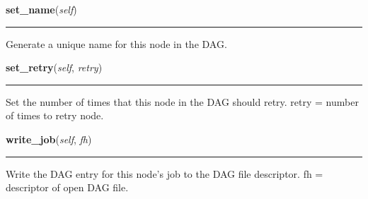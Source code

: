     \label{pipeline:CondorDAGNode:set_name}
    \vspace{0.5ex}

    \noindent\begin{boxedminipage}{\textwidth}

    \raggedright \textbf{set\_name}(\textit{self})

    \vspace{-1.5ex}

    \rule{\textwidth}{0.5\fboxrule}
    Generate a unique name for this node in the DAG.

    \vspace{1ex}

    \end{boxedminipage}

    \label{pipeline:CondorDAGNode:set_retry}
    \vspace{0.5ex}

    \noindent\begin{boxedminipage}{\textwidth}

    \raggedright \textbf{set\_retry}(\textit{self}, \textit{retry})

    \vspace{-1.5ex}

    \rule{\textwidth}{0.5\fboxrule}
    Set the number of times that this node in the DAG should retry. retry 
    = number of times to retry node.

    \vspace{1ex}

    \end{boxedminipage}

    \label{pipeline:CondorDAGNode:write_job}
    \vspace{0.5ex}

    \noindent\begin{boxedminipage}{\textwidth}

    \raggedright \textbf{write\_job}(\textit{self}, \textit{fh})

    \vspace{-1.5ex}

    \rule{\textwidth}{0.5\fboxrule}
    Write the DAG entry for this node's job to the DAG file descriptor. 
    fh = descriptor of open DAG file.

    \vspace{1ex}

    \end{boxedminipage}

